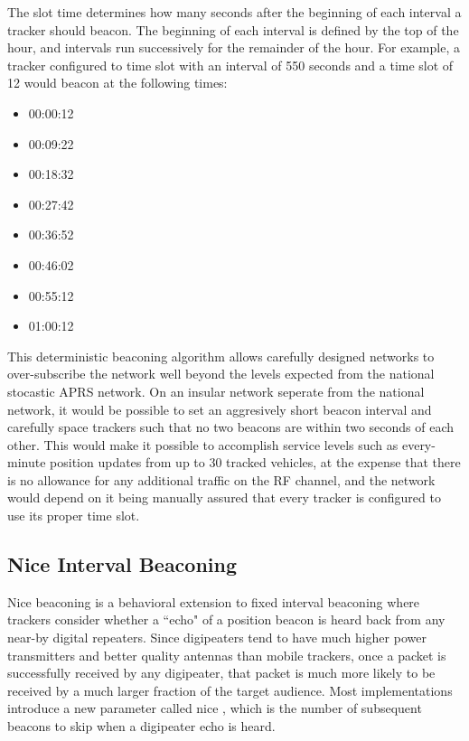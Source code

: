 The slot time determines how many seconds after the beginning of each interval
a tracker should beacon. The beginning of each interval is defined by the top of
the hour, and intervals run successively for the remainder of the hour.
For example, a tracker configured to time slot with an interval of 550 seconds and
a time slot of 12 would beacon at the following times:
\begin{itemize}
\item 00:00:12
\item 00:09:22
\item 00:18:32
\item 00:27:42
\item 00:36:52
\item 00:46:02
\item 00:55:12
\item 01:00:12
\end{itemize}

This deterministic beaconing algorithm allows carefully designed networks to 
over-subscribe the network well beyond the levels expected from 
the national stocastic APRS network. 
On an insular network seperate from the national
network, it would be possible to set an aggresively short beacon interval and 
carefully space trackers such that no two beacons are within two seconds of each
other. This would make it possible to accomplish service levels such as
every-minute position updates from up to 30 tracked vehicles, 
at the expense that there is no allowance for any additional traffic 
on the RF channel, and the network would depend on it being manually 
assured that every tracker is configured to use its proper time slot.

\subsection{Nice Interval Beaconing}

Nice beaconing is a behavioral extension to fixed interval beaconing 
where trackers consider whether a ``echo"
of a position beacon is heard back from any near-by digital repeaters.
Since digipeaters tend to have much higher power transmitters and better quality
antennas than mobile trackers, once a packet is successfully received by any 
digipeater, that packet is much more likely to be received by a much larger
fraction of the target audience. Most implementations introduce a new parameter
called nice \cite[p.~38]{ot3manual}, 
which is the number of subsequent beacons to skip when a digipeater echo is heard.

